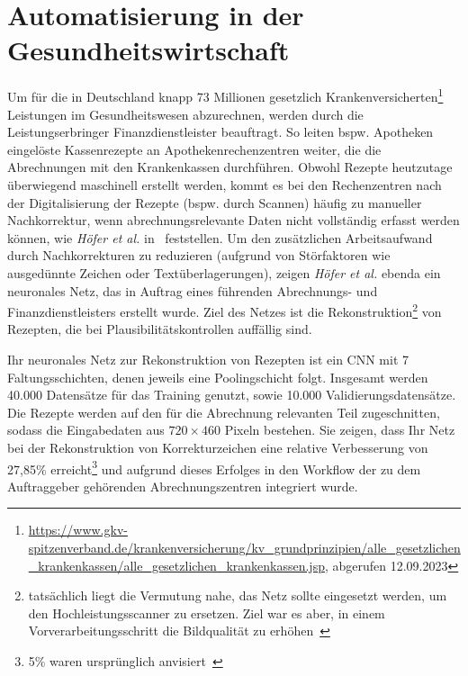 \section{Automatisierung in der Gesundheitswirtschaft}
Um für die in Deutschland knapp 73 Millionen gesetzlich Krankenversicherten\footnote{
    \url{https://www.gkv-spitzenverband.de/krankenversicherung/kv_grundprinzipien/alle_gesetzlichen_krankenkassen/alle_gesetzlichen_krankenkassen.jsp}, abgerufen 12.09.2023
} Leistungen im Gesundheitswesen abzurechnen, werden durch die Leistungserbringer Finanzdienstleister beauftragt. So leiten bspw. Apotheken eingelöste Kassenrezepte an Apothekenrechenzentren weiter, die die Abrechnungen mit den Krankenkassen durchführen. Obwohl Rezepte heutzutage überwiegend maschinell erstellt werden, kommt es bei den Rechenzentren nach der Digitalisierung der Rezepte (bspw. durch Scannen) häufig zu manueller Nachkorrektur, wenn abrechnungsrelevante Daten nicht vollständig erfasst werden können, wie \textit{Höfer et al.} in~\cite[698]{HWN22} feststellen. Um den zusätzlichen Arbeitsaufwand durch Nachkorrekturen zu reduzieren (aufgrund von Störfaktoren wie ausgedünnte Zeichen oder Textüberlagerungen), zeigen \textit{Höfer et al.} ebenda ein neuronales Netz, das in Auftrag eines führenden Abrechnungs- und Finanzdienstleisters erstellt wurde. Ziel des Netzes ist die Rekonstruktion\footnote{
    tatsächlich liegt die Vermutung nahe, das Netz sollte eingesetzt werden, um den Hochleistungsscanner zu ersetzen. Ziel war es aber, in einem Vorverarbeitungsschritt die Bildqualität zu erhöhen~\cite[698]{HWN22}
} von Rezepten, die bei Plausibilitätskontrollen auffällig sind.

Ihr neuronales Netz zur Rekonstruktion von Rezepten ist ein CNN mit 7 Faltungsschichten, denen jeweils eine Poolingschicht folgt. Insgesamt werden 40.000 Datensätze für das Training genutzt, sowie 10.000 Validierungsdatensätze. Die Rezepte werden auf den für die Abrechnung relevanten Teil zugeschnitten, sodass die Eingabedaten aus $720 \times 460$ Pixeln bestehen. Sie zeigen, dass Ihr Netz bei der Rekonstruktion von Korrekturzeichen eine relative Verbesserung von 27,85\% erreicht\footnote{
    5\% waren ursprünglich anvisiert~\cite[711]{HWN22}
} und aufgrund dieses Erfolges in den  Workflow der zu dem Auftraggeber gehörenden Abrechnungszentren integriert wurde.


